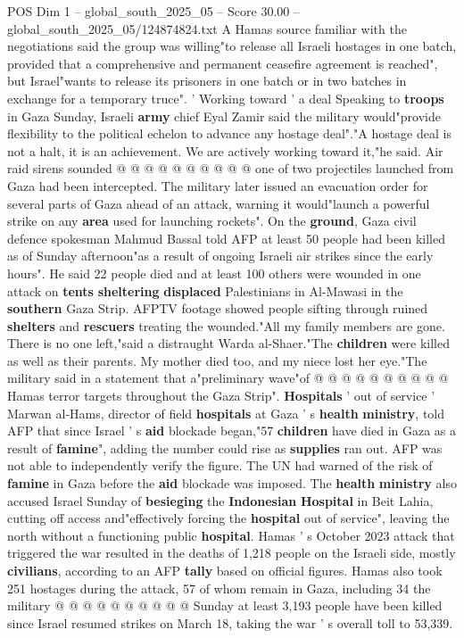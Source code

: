 \begin{textsample}{POS Dim 1 – global\_south\_2025\_05 – Score 30.00 – global\_south\_2025\_05/124874824.txt}
A Hamas source familiar with the negotiations said the group was willing"to release all Israeli hostages in one batch, provided that a comprehensive and permanent ceasefire agreement is reached", but Israel"wants to release its prisoners in one batch or in two batches in exchange for a temporary truce". ' Working toward ' a deal Speaking to \textbf{troops} in Gaza Sunday, Israeli \textbf{army} chief Eyal Zamir said the military would"provide flexibility to the political echelon to advance any hostage deal"."A hostage deal is not a halt, it is an achievement.
We are actively working toward it,"he said.
Air raid sirens sounded @ @ @ @ @ @ @ @ @ @ one of two projectiles launched from Gaza had been intercepted.
The military later issued an evacuation order for several parts of Gaza ahead of an attack, warning it would"launch a powerful strike on any \textbf{area} used for launching rockets".
On the \textbf{ground}, Gaza civil defence spokesman Mahmud Bassal told AFP at least 50 people had been killed as of Sunday afternoon"as a result of ongoing Israeli air strikes since the early hours".
He said 22 people died and at least 100 others were wounded in one attack on \textbf{tents} \textbf{sheltering} \textbf{displaced} Palestinians in Al-Mawasi in the \textbf{southern} Gaza Strip.
AFPTV footage showed people sifting through ruined \textbf{shelters} and \textbf{rescuers} treating the wounded."All my family members are gone.
There is no one left,"said a distraught Warda al-Shaer."The \textbf{children} were killed as well as their parents.
My mother died too, and my niece lost her eye."The military said in a statement that a"preliminary wave"of @ @ @ @ @ @ @ @ @ @ Hamas terror targets throughout the Gaza Strip". \textbf{Hospitals} ' out of service ' Marwan al-Hams, director of field \textbf{hospitals} at Gaza ' s \textbf{health} \textbf{ministry}, told AFP that since Israel ' s \textbf{aid} blockade began,"57 \textbf{children} have died in Gaza as a result of \textbf{famine}", adding the number could rise as \textbf{supplies} ran out.
AFP was not able to independently verify the figure.
The UN had warned of the risk of \textbf{famine} in Gaza before the \textbf{aid} blockade was imposed.
The \textbf{health} \textbf{ministry} also accused Israel Sunday of \textbf{besieging} the \textbf{Indonesian} \textbf{Hospital} in Beit Lahia, cutting off access and"effectively forcing the \textbf{hospital} out of service", leaving the north without a functioning public \textbf{hospital}.
Hamas ' s October 2023 attack that triggered the war resulted in the deaths of 1,218 people on the Israeli side, mostly \textbf{civilians}, according to an AFP \textbf{tally} based on official figures.
Hamas also took 251 hostages during the attack, 57 of whom remain in Gaza, including 34 the military @ @ @ @ @ @ @ @ @ @ Sunday at least 3,193 people have been killed since Israel resumed strikes on March 18, taking the war ' s overall toll to 53,339.

\end{textsample}
